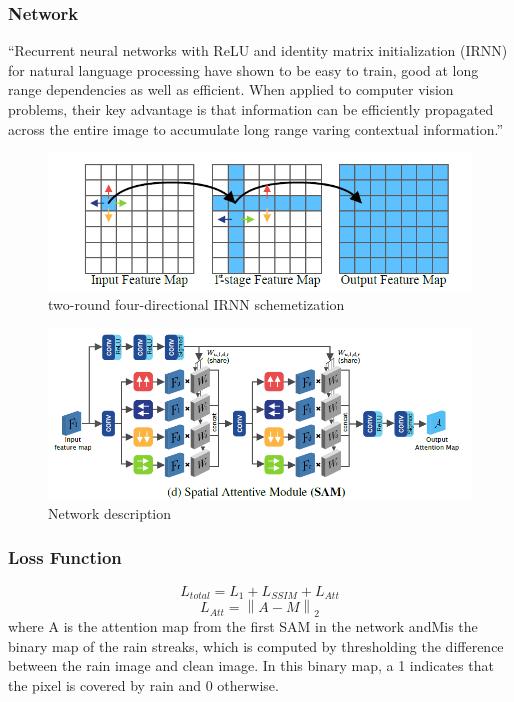 \documentclass{article}
\newcommand\norm[1]{\left\lVert#1\right\rVert}
\begin{document}
\subsubsection{Network}
``Recurrent neural networks with ReLU and identity matrix initialization (IRNN) for natural language processing have shown to be easy to train, good at long range dependencies as well as efficient. When applied to computer vision problems, their key advantage is that information can be efficiently propagated across the entire image to accumulate long range varing contextual information.''
\begin{figure}[H]
\centering
\includegraphics[width=\linewidth]{two-round-four-directional IRNN.PNG}
\caption{two-round four-directional IRNN schemetization}
\end{figure}
\begin{figure}[H]
\centering
\includegraphics[width=\linewidth]{SPANet}
\caption{Network description}
\end{figure}
\subsubsection{Loss Function}
\begin{equation}
L_{total}=L_1+L_{SSIM}+L_{Att}
\end{equation}
\begin{equation}
L_{Att}=\norm{A-M}_2
\end{equation}
where A is the attention map from the first SAM in the network andMis the binary map of the rain streaks, which is computed by thresholding the difference between the rain image and clean image. In this binary map, a 1 indicates that the pixel is covered by rain and 0 otherwise.
\end{document}
